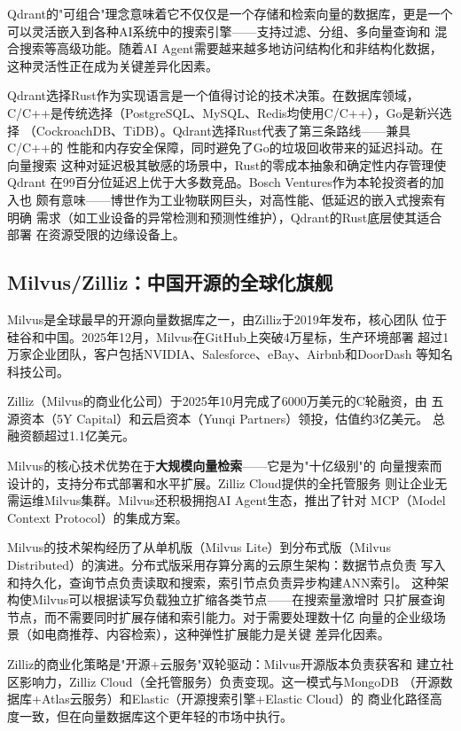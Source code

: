 Qdrant的"可组合"理念意味着它不仅仅是一个存储和检索向量的数据库，更是一个
可以灵活嵌入到各种AI系统中的搜索引擎——支持过滤、分组、多向量查询和
混合搜索等高级功能。随着AI Agent需要越来越多地访问结构化和非结构化数据，
这种灵活性正在成为关键差异化因素。

Qdrant选择Rust作为实现语言是一个值得讨论的技术决策。在数据库领域，
C/C++是传统选择（PostgreSQL、MySQL、Redis均使用C/C++），Go是新兴选择
（CockroachDB、TiDB）。Qdrant选择Rust代表了第三条路线——兼具C/C++的
性能和内存安全保障，同时避免了Go的垃圾回收带来的延迟抖动。在向量搜索
这种对延迟极其敏感的场景中，Rust的零成本抽象和确定性内存管理使Qdrant
在99百分位延迟上优于大多数竞品。Bosch Ventures作为本轮投资者的加入也
颇有意味——博世作为工业物联网巨头，对高性能、低延迟的嵌入式搜索有明确
需求（如工业设备的异常检测和预测性维护），Qdrant的Rust底层使其适合部署
在资源受限的边缘设备上。

\subsection{Milvus/Zilliz：中国开源的全球化旗舰}
\label{subsec:milvus}

Milvus是全球最早的开源向量数据库之一，由Zilliz于2019年发布，核心团队
位于硅谷和中国。2025年12月，Milvus在GitHub上突破4万星标，生产环境部署
超过1万家企业团队，客户包括NVIDIA、Salesforce、eBay、Airbnb和DoorDash
等知名科技公司。

Zilliz（Milvus的商业化公司）于2025年10月完成了6000万美元的C轮融资，由
五源资本（5Y Capital）和云启资本（Yunqi Partners）领投，估值约3亿美元。
总融资额超过1.1亿美元。

Milvus的核心技术优势在于\textbf{大规模向量检索}——它是为"十亿级别"的
向量搜索而设计的，支持分布式部署和水平扩展。Zilliz Cloud提供的全托管服务
则让企业无需运维Milvus集群。Milvus还积极拥抱AI Agent生态，推出了针对
MCP（Model Context Protocol）的集成方案。

Milvus的技术架构经历了从单机版（Milvus Lite）到分布式版（Milvus
Distributed）的演进。分布式版采用存算分离的云原生架构：数据节点负责
写入和持久化，查询节点负责读取和搜索，索引节点负责异步构建ANN索引。
这种架构使Milvus可以根据读写负载独立扩缩各类节点——在搜索量激增时
只扩展查询节点，而不需要同时扩展存储和索引能力。对于需要处理数十亿
向量的企业级场景（如电商推荐、内容检索），这种弹性扩展能力是关键
差异化因素。

Zilliz的商业化策略是"开源+云服务"双轮驱动：Milvus开源版本负责获客和
建立社区影响力，Zilliz Cloud（全托管服务）负责变现。这一模式与MongoDB
（开源数据库+Atlas云服务）和Elastic（开源搜索引擎+Elastic Cloud）的
商业化路径高度一致，但在向量数据库这个更年轻的市场中执行。

